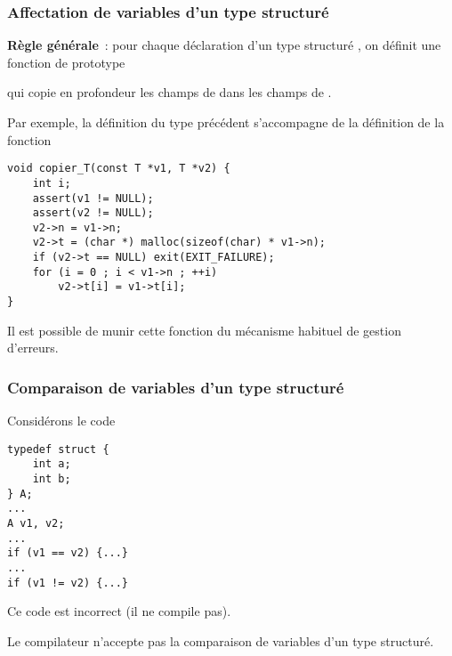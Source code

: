 \begin{frame}[fragile]
\frametitle{Affectation de variables d'un type structuré}
{\bf Règle générale}~: pour chaque déclaration d'un type structuré
, on définit une fonction de prototype
\begin{center}
\end{center}
qui \alert{copie en profondeur} les champs de  dans les champs
de .
\medskip

Par exemple, la définition du type  précédent s'accompagne de la
définition de la fonction
\begin{lstlisting}
void copier_T(const T *v1, T *v2) {
    int i;
    assert(v1 != NULL);
    assert(v2 != NULL);
    v2->n = v1->n;
    v2->t = (char *) malloc(sizeof(char) * v1->n);
    if (v2->t == NULL) exit(EXIT_FAILURE);
    for (i = 0 ; i < v1->n ; ++i)
        v2->t[i] = v1->t[i];
}
\end{lstlisting}

Il est possible de munir cette fonction du mécanisme habituel de
gestion d'erreurs.
\end{frame}

\begin{frame}[fragile]
\frametitle{Comparaison de variables d'un type structuré}
Considérons le code
\begin{multicols}{2}
\begin{lstlisting}
typedef struct {
    int a;
    int b;
} A;
...
A v1, v2;
...
if (v1 == v2) {...}
...
if (v1 != v2) {...}
\end{lstlisting}
\end{multicols}
\medskip

Ce code est incorrect (il ne compile pas).
\medskip

Le compilateur n'accepte pas la comparaison de variables d'un type
structuré.
\smallskip

\smallskip

\end{frame}


